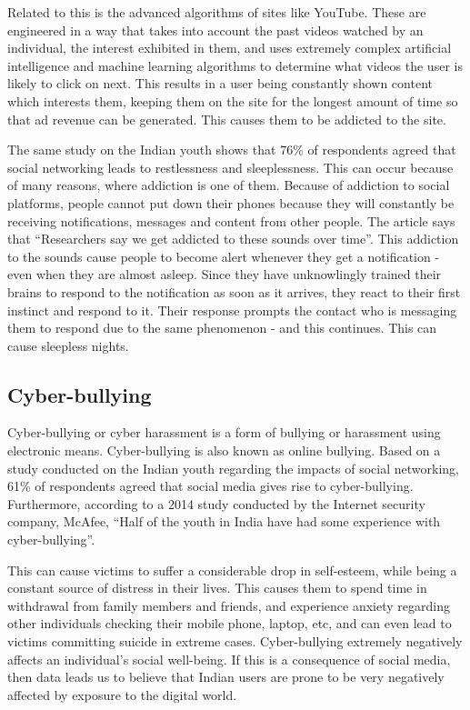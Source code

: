 \documentclass[a4paper, 11pt]{article}
\begin{document}
Related to this is the advanced algorithms of sites like YouTube. These are engineered in a way that takes into account the past videos watched by an individual, the interest exhibited in them, and uses extremely complex artificial intelligence and machine learning algorithms to determine what videos the user is likely to click on next.\cite{youtube-algorithm} This results in a user being constantly shown content which interests them, keeping them on the site for the longest amount of time so that ad revenue can be generated. This causes them to be addicted to the site.

The same study on the Indian youth shows that 76\% of respondents agreed that social networking leads to restlessness and sleeplessness.\cite{indian-youth-study} This can occur because of many reasons, where addiction is one of them. Because of addiction to social platforms, people cannot put down their phones because they will constantly be receiving notifications, messages and content from other people. The article says that “Researchers say we get addicted to these sounds over time”. This addiction to the sounds cause people to become alert whenever they get a notification - even when they are almost asleep. Since they have unknowlingly trained their brains to respond to the notification as soon as it arrives, they react to their first instinct and respond to it. Their response prompts the contact who is messaging them to respond due to the same phenomenon - and this continues. This can cause sleepless nights.

\subsection{Cyber-bullying}
Cyber-bullying or cyber harassment is a form of bullying or harassment using electronic means. Cyber-bullying is also known as online bullying. Based on a study conducted on the Indian youth regarding the impacts of social networking, 61\% of respondents agreed that social media gives rise to cyber-bullying. Furthermore, according to a 2014 study conducted by the Internet security company, McAfee, “Half of the youth in India have had some experience with cyber-bullying”.

This can cause victims to suffer a considerable drop in self-esteem, while being a constant source of distress in their lives. This causes them to spend time in withdrawal from family members and friends, and experience anxiety regarding other individuals checking their mobile phone, laptop, etc, and can even lead to victims committing suicide in extreme cases. Cyber-bullying extremely negatively affects an individual’s social well-being. If this is a consequence of social media, then data leads us to believe that Indian users are prone to be very negatively affected by exposure to the digital world.
\end{document}
